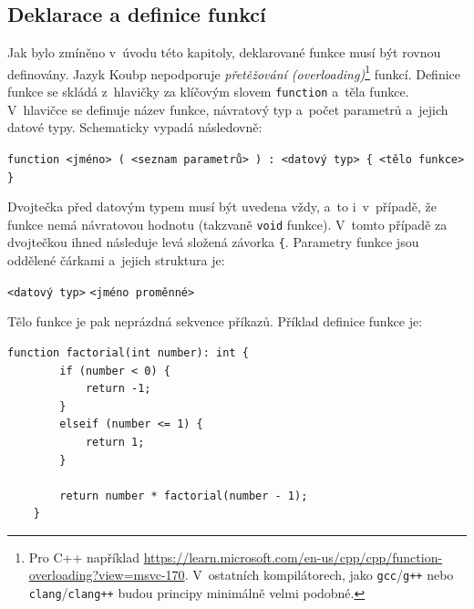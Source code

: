 \subsection*{Deklarace a definice funkcí}
Jak bylo zmíněno v~úvodu této kapitoly, deklarované funkce musí být rovnou definovány.
Jazyk Koubp nepodporuje \emph{přetěžování (overloading)}\footnote{Pro C++ například \href{https://learn.microsoft.com/en-us/cpp/cpp/function-overloading?view=msvc-170}{https://learn.microsoft.com/en-us/cpp/cpp/function-overloading?view=msvc-170}. V~ostatních kompilátorech, jako \texttt{gcc}/\texttt{g++} nebo \texttt{clang}/\texttt{clang++} budou principy minimálně velmi podobné. } funkcí.
Definice funkce se skládá z~hlavičky za klíčovým slovem \texttt{function} a~těla funkce.
V~hlavičce se definuje název funkce, návratový typ a~počet parametrů a~jejich datové typy.
Schematicky vypadá následovně:
\begin{center}
    \texttt{function <jméno> ( <seznam parametrů> ) : <datový typ> \{ <tělo funkce> \}}
\end{center}
Dvojtečka před datovým typem musí být uvedena vždy, a~to i~v~případě, že funkce nemá návratovou hodnotu (takzvaně \texttt{void} funkce).
V~tomto případě za dvojtečkou ihned následuje levá složená závorka \texttt{\{}.
Parametry funkce jsou oddělené čárkami a~jejich struktura je:
\begin{center}
     \texttt{<datový typ>} \texttt{<jméno proměnné>}
\end{center}
Tělo funkce je pak neprázdná sekvence příkazů.
Příklad definice funkce je:
\begin{lstlisting}[language=Koubp]
    function factorial(int number): int {
        if (number < 0) {
            return -1;
        }
        elseif (number <= 1) {
            return 1;
        }

        return number * factorial(number - 1);
    }
\end{lstlisting}

